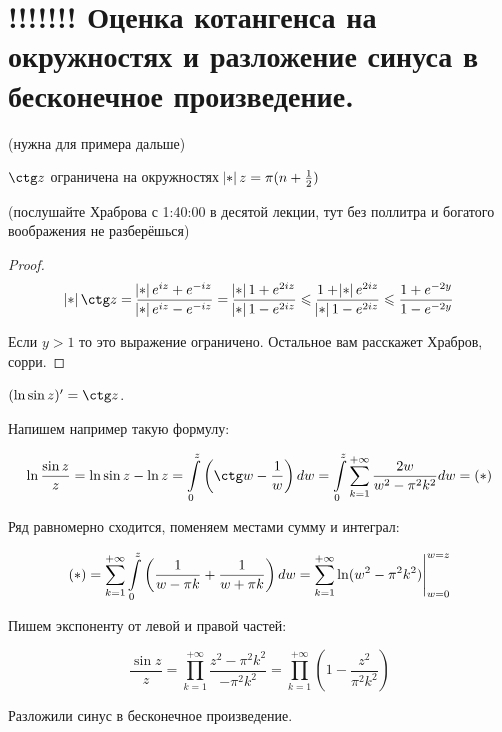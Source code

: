 \section{!!!!!!! Оценка котангенса на окружностях и разложение синуса в бесконечное произведение.}

\begin{lemma} (нужна для примера дальше)

    $\ctg z$ ограничена на окружностях $\abs{z} = \pi(n + \frac{1}{2})$

    (послушайте Храброва с 1:40:00 в десятой лекции, тут
    без поллитра и богатого воображения не разберёшься)
\end{lemma}

\begin{proof}
    \[
        \abs{\ctg z} = \frac{\abs{e^{iz} + e^{-iz}}}{\abs{e^{iz}-e^{-iz}}}
        = \frac{\abs{1+e^{2iz}}}{\abs{1-e^{2iz}}}
        \le \frac{1+\abs{e^{2iz}}}{\abs{1-e^{2iz}}}
        \le \frac{1+e^{-2y}}{1-e^{-2y}}
    \]

    Если $y > 1$ то это выражение ограничено.
    Остальное вам расскажет Храбров, сорри.
\end{proof}

\begin{example}
    $(\ln \sin z)' = \ctg z$.

    Напишем например такую формулу:

    \[
        \ln \frac{\sin z}{z}
        = \ln \sin z - \ln z
        = \int\limits_0^{z}
        \left(\ctg w - \frac{1}w\right)dw
        = \int\limits_0^z \sum\limits_{k=1}^{+\infty}
        \frac{2w}{w^2-\pi^2k^2}dw = (*)
    \]

    Ряд равномерно сходится, поменяем местами сумму и интеграл:

    \[
        (*) =
        \sum\limits_{k=1}^{+\infty}
        \int\limits_0^z \left(\frac{1}{w-\pi k} + \frac{1}{w+\pi k}\right)
        dw = \sum\limits_{k=1}^{+\infty}
        \eval{\ln (w^2-\pi^2k^2)}_{w = 0}^{w = z}
    \]

    Пишем экспоненту от левой и правой частей:

    \[
        \frac{\sin z}{z} = \prod_{k=1}^{+\infty}
        \frac{z^2-\pi^2k^2}{-\pi^2k^2}
        = \prod_{k=1}^{+\infty} \left(1 - \frac{z^2}{\pi^2 k^2}\right)
    \]

    Разложили синус в бесконечное произведение.
\end{example}

\newpage

